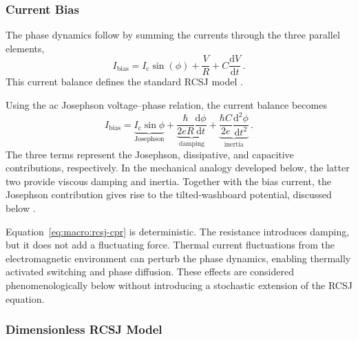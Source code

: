         \subsubsection*{Current Bias}

            The phase dynamics follow by summing the currents through the three parallel elements,
            \begin{equation}
                I_\mathrm{bias} = I_\mathrm{c}\sin(\phi)
                    + \frac{V}{R}
                    + C\frac{\mathrm{d}V}{\mathrm{d}t}\,.
            \end{equation}
            This current balance defines the standard RCSJ model \cite{stewart_currentvoltage_1968,mccumber_effect_1968}.


            Using the ac Josephson voltage--phase relation, the current balance becomes
            \begin{equation}
                I_\mathrm{bias}
                =
                \underbrace{I_\mathrm{c}\sin\phi}_{\text{Josephson}}
                +
                \underbrace{\frac{\hbar}{2eR}\frac{\mathrm{d}\phi}{\mathrm{d}t}}_{\text{damping}}
                +
                \underbrace{\frac{\hbar C}{2e}\frac{\mathrm{d}^2\phi}{\mathrm{d}t^2}}_{\text{inertia}}\,.
                \label{eq:macro:rcsj-cpr}
            \end{equation}
            The three terms represent the Josephson, dissipative, and capacitive contributions, respectively. In the mechanical analogy developed below, the latter two provide viscous damping and inertia. Together with the bias current, the Josephson contribution gives rise to the tilted-washboard potential, discussed below \cite{stewart_currentvoltage_1968,mccumber_effect_1968}.

            Equation~\eqref{eq:macro:rcsj-cpr} is deterministic. The resistance introduces damping, but it does not add a fluctuating force. Thermal current fluctuations from the electromagnetic environment can perturb the phase dynamics, enabling thermally activated switching and phase diffusion. These effects are considered phenomenologically below without introducing a stochastic extension of the RCSJ equation.

        \subsubsection*{Dimensionless RCSJ Model}

